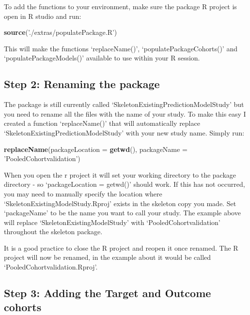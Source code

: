 \documentclass[
]{article}
\newenvironment{Shaded}{\begin{snugshade}}{\end{snugshade}}
\newcommand{\DataTypeTok}[1]{\textcolor[rgb]{0.13,0.29,0.53}{#1}}
\newcommand{\KeywordTok}[1]{\textcolor[rgb]{0.13,0.29,0.53}{\textbf{#1}}}
\newcommand{\NormalTok}[1]{#1}
\newcommand{\StringTok}[1]{\textcolor[rgb]{0.31,0.60,0.02}{#1}}
\begin{document}
To add the functions to your environment, make sure the package R
project is open in R studio and run:

\begin{Shaded}
\begin{Highlighting}[]
\KeywordTok{source}\NormalTok{(}\StringTok{'./extras/populatePackage.R'}\NormalTok{)}
\end{Highlighting}
\end{Shaded}

This will make the functions `replaceName()', `populatePackageCohorts()'
and `populatePackageModels()' available to use within your R session.

\hypertarget{step-2-renaming-the-package}{%
\subsection{Step 2: Renaming the
package}\label{step-2-renaming-the-package}}

The package is still currently called
`SkeletonExistingPredictionModelStudy' but you need to rename all the
files with the name of your study. To make this easy I created a
function `replaceName()' that will automatically replace
`SkeletonExistingPredictionModelStudy' with your new study name. Simply
run:

\begin{Shaded}
\begin{Highlighting}[]
\KeywordTok{replaceName}\NormalTok{(}\DataTypeTok{packageLocation =} \KeywordTok{getwd}\NormalTok{(), }
          \DataTypeTok{packageName =} \StringTok{'PooledCohortvalidation'}\NormalTok{)}
\end{Highlighting}
\end{Shaded}

When you open the r project it will set your working directory to the
package directory - so `packageLocation = getwd()' should work. If this
has not occurred, you may need to manually specify the location where
`SkeletonExistingModelStudy.Rproj' exists in the skeleton copy you made.
Set `packageName' to be the name you want to call your study. The
example above will replace `SkeletonExistingModelStudy' with
`PooledCohortvalidation' throughout the skeleton package.

It is a good practice to close the R project and reopen it once renamed.
The R project will now be renamed, in the example about it would be
called `PooledCohortvalidation.Rproj'.

\hypertarget{step-3-adding-the-target-and-outcome-cohorts}{%
\subsection{Step 3: Adding the Target and Outcome
cohorts}\label{step-3-adding-the-target-and-outcome-cohorts}}
\end{document}
